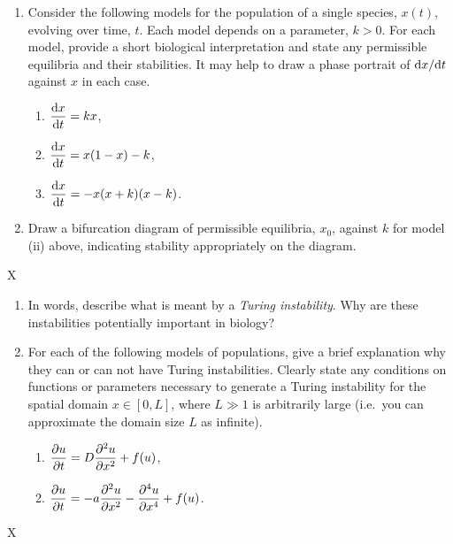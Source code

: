 \documentclass[a4paper,12pt]{article}
\begin{document}
%
%
%

\begin{enumerate}
	\question{}
	{ %
	\begin{enumerate}
    \item Consider the following models for the population of a single species, $x(t)$, evolving over time, $t$. Each model depends on a parameter, $k>0$. For each model, provide a short biological interpretation and state any permissible equilibria and their stabilities. It may help to draw a phase portrait of $\fd{x}{t}$ against $x$ in each case.
    \begin{enumerate}[label=(\roman*)]
        \item $\displaystyle\fd{x}{t} = kx$,
        \item $\displaystyle\fd{x}{t} = x(1-x) - k$,
        \item $\displaystyle\fd{x}{t} = -x(x+k)(x-k)$.
    \end{enumerate}
    \item
    Draw a bifurcation diagram of permissible equilibria, $x_0$, against $k$ for model (ii) above, indicating stability appropriately on the diagram.
    \end{enumerate}
	}
	{ %
	X
	}
	\vspace{1cm}
	\question{}
	{ %
	\begin{enumerate}
    \item In words, describe what is meant by a \emph{Turing instability}. Why are these instabilities potentially important in biology?
    \item For each of the following models of populations, give a brief explanation why they can or can not have Turing instabilities. Clearly state any conditions on functions or parameters necessary to generate a Turing instability for the spatial domain $x \in [0,L]$, where $L\gg 1$ is arbitrarily large (i.e.~you can approximate the domain size $L$ as infinite). 
    \begin{enumerate}[label=(\roman*)]
        \item $\displaystyle \pd{u}{t} = D\pdd{u}{x} + f(u)$,
        \item $\displaystyle \pd{u}{t} = -a\pdd{u}{x} - \pdn{4}{u}{x} + f(u)$.
    \end{enumerate}
    \end{enumerate}
    }
    { %
	X
    }    
    
\end{enumerate}
\end{document}
